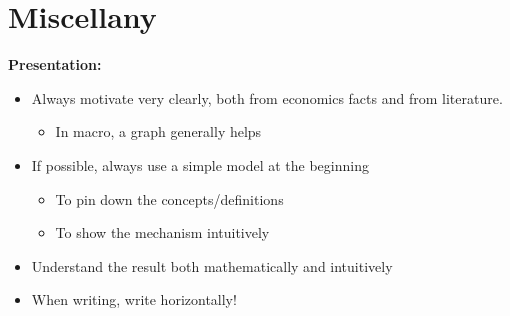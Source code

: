 \documentclass{book}
\theoremstyle{plain}
\theoremstyle{definition}
\begin{document}
\chapter{Miscellany} %
\label{cha:miscellany}

\noindent
\textbf{Presentation:}
\begin{itemize}
	\item Always motivate very clearly, both from economics facts and from literature.
	\begin{itemize}
		\item In macro, a graph generally helps
	\end{itemize}
	\item If possible, always use a simple model at the beginning
	\begin{itemize}
		\item To pin down the concepts/definitions
		\item To show the mechanism intuitively
	\end{itemize}
	\item Understand the result both mathematically and intuitively
	\item When writing, write horizontally!
\end{itemize}




\renewcommand\refname{Reference}


\end{document}
